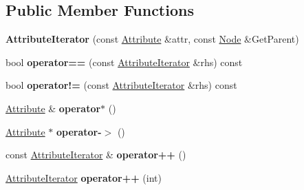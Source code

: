 \subsection*{Public Member Functions}
\begin{DoxyCompactItemize}
\item 
\hypertarget{classphys_1_1xml_1_1AttributeIterator_a175551035493cea0c9a56e36adcbac23}{
{\bfseries AttributeIterator} (const \hyperlink{classphys_1_1xml_1_1Attribute}{Attribute} \&attr, const \hyperlink{classphys_1_1xml_1_1Node}{Node} \&GetParent)}
\label{de/d78/classphys_1_1xml_1_1AttributeIterator_a175551035493cea0c9a56e36adcbac23}

\item 
\hypertarget{classphys_1_1xml_1_1AttributeIterator_a5310ea26bd19cb1c32e962c03ea0dc62}{
bool {\bfseries operator==} (const \hyperlink{classphys_1_1xml_1_1AttributeIterator}{AttributeIterator} \&rhs) const }
\label{de/d78/classphys_1_1xml_1_1AttributeIterator_a5310ea26bd19cb1c32e962c03ea0dc62}

\item 
\hypertarget{classphys_1_1xml_1_1AttributeIterator_a6b80c4c5317f97921511e25597a3403f}{
bool {\bfseries operator!=} (const \hyperlink{classphys_1_1xml_1_1AttributeIterator}{AttributeIterator} \&rhs) const }
\label{de/d78/classphys_1_1xml_1_1AttributeIterator_a6b80c4c5317f97921511e25597a3403f}

\item 
\hypertarget{classphys_1_1xml_1_1AttributeIterator_a28e8472f82ffc6f8eb2750c0c7e60e69}{
\hyperlink{classphys_1_1xml_1_1Attribute}{Attribute} \& {\bfseries operator$\ast$} ()}
\label{de/d78/classphys_1_1xml_1_1AttributeIterator_a28e8472f82ffc6f8eb2750c0c7e60e69}

\item 
\hypertarget{classphys_1_1xml_1_1AttributeIterator_a7db7ffe3eebe1e4d5d9cb2623fc2d019}{
\hyperlink{classphys_1_1xml_1_1Attribute}{Attribute} $\ast$ {\bfseries operator-\/$>$} ()}
\label{de/d78/classphys_1_1xml_1_1AttributeIterator_a7db7ffe3eebe1e4d5d9cb2623fc2d019}

\item 
\hypertarget{classphys_1_1xml_1_1AttributeIterator_a471aae245b01fe34589c15df6afbcc0e}{
const \hyperlink{classphys_1_1xml_1_1AttributeIterator}{AttributeIterator} \& {\bfseries operator++} ()}
\label{de/d78/classphys_1_1xml_1_1AttributeIterator_a471aae245b01fe34589c15df6afbcc0e}

\item 
\hypertarget{classphys_1_1xml_1_1AttributeIterator_a9925e89424ac0d02453df60b4a8f21a7}{
\hyperlink{classphys_1_1xml_1_1AttributeIterator}{AttributeIterator} {\bfseries operator++} (int)}
\label{de/d78/classphys_1_1xml_1_1AttributeIterator_a9925e89424ac0d02453df60b4a8f21a7}


\end{DoxyCompactItemize}
